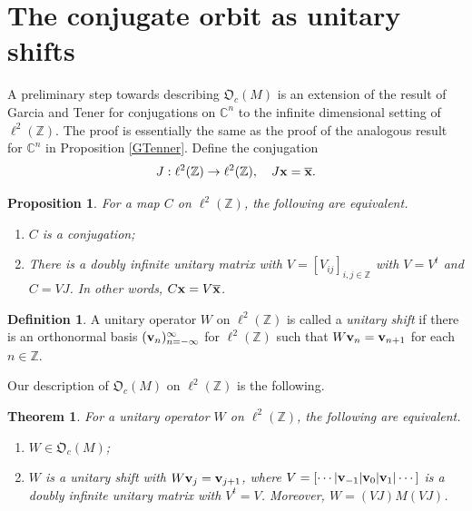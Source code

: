 \documentclass{dis}
\theoremstyle{plain}
\newtheorem{Proposition}[equation]{Proposition}
\newtheorem{Theorem}[equation]{Theorem}
\theoremstyle{definition}
\newtheorem{Definition}[equation]{Definition}
\def\C{\mathbb{C}}
\def\Z{\mathbb{Z}}
\renewcommand{\vec}[1]{{\bf #1}}
\newcommand{\0}{{\color{lightgray}0}}
\begin{document}
\section{The conjugate orbit as unitary shifts}

A preliminary step towards describing $\mathfrak{O}_c(M)$ is an  extension  of the result of Garcia and Tener  \cite[Lemma 3.2]{MR2966041} for  conjugations on $\C^n$ to the infinite dimensional setting of  $\ell^2(\Z)$. The proof is essentially the same as the proof of the analogous result for $\C^n$ in Proposition \ref{GTenner}. Define the conjugation 
$$J: \ell^2(\Z) \to \ell^2(\Z), \quad J \vec{x} = \overline{\vec{x}}.$$

\begin{Proposition}\label{OShfgfdsfa}
For a map $C$ on $\ell^2(\Z)$, the following are equivalent. 
\begin{enumerate}
\item $C$ is a conjugation; 
\item There is a doubly infinite unitary matrix with $V = [V_{i j}]_{i, j \in \Z}$ with $V = V^{t}$ and $C = V J$. In other words, $C \vec{x} = V \overline{\vec{x}}$.
\end{enumerate}
\end{Proposition}

\begin{Definition}
A unitary operator $W$ on $\ell^2(\Z)$ is called a {\em unitary shift} if there is an orthonormal basis $(\vec{v}_n)_{n = -\infty}^{\infty}$ for $\ell^2(\Z)$ such that $W \vec{v}_n = \vec{v }_{n + 1}$ for each $n \in \Z.$
\end{Definition}

Our description of $\mathfrak{O}_c(M)$ on $\ell^2(\Z)$ is the following.

\begin{Theorem}\label{0934t4rhhHHCccvvJ}
For a unitary operator $W$ on $\ell^2(\Z)$, the following are equivalent. 
\begin{enumerate}
\item $W \in \mathfrak{O}_c(M)$; 
\item $W$ is a unitary shift with $W \vec{v}_{j} = \vec{v}_{j + 1}$, where $V = [\cdots| \vec{v}_{-1}|\vec{v}_0|\vec{v}_1|\cdots]$ is a doubly infinite unitary matrix with $V^{t} = V$. Moreover, $W = (VJ) M (VJ)$.
\end{enumerate}
\end{Theorem}
\end{document}
